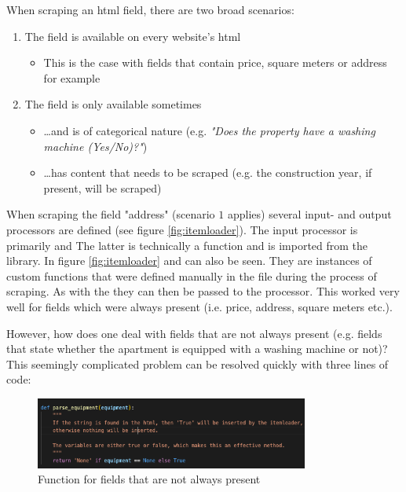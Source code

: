 \documentclass[main]{subfiles}
\begin{document}
When scraping an \acs*{html} field, there are two broad scenarios:
\begin{enumerate}
    \item The field is available on every website's \acs*{html}
    \begin{itemize}
        \item This is the case with fields that contain price, square meters or address for example
    \end{itemize}
    \item The field is only available sometimes
    \begin{itemize}
        \item …and is of categorical nature (e.g. \textit{"Does the property have a washing machine (Yes/No)?"})
        \item …has content that needs to be scraped (e.g. the construction year, if present, will be scraped)
    \end{itemize}
\end{enumerate}

When scraping the field "address" (scenario $1$ applies) several input- and output processors are defined (see figure \ref{fig:itemloader}).
The input processor is primarily \pkg[MapCompose()] and 
The latter is technically a function and is imported from the  library.
In figure \ref{fig:itemloader}  and   can also be seen.
They are instances of custom functions that were defined manually 
in the \pkg[items.py] file during the process of scraping.
As with the  they can then be passed to the \pkg[MapCompose()] processor.
This worked very well for fields which were always present (i.e. price, address, square meters etc.).

However, how does one deal with fields that are not always present
(e.g. fields that state whether the apartment is equipped with a washing machine or not)?
This seemingly complicated problem can be resolved quickly with three lines of code:

\begin{figure}[htbp]
    \centerline{
        \includegraphics[width = 90mm]{prog_6.png}}
    \caption{Function for fields that are not always present}
    \label{fig:ispresentornot}
\end{figure}
\end{document}

